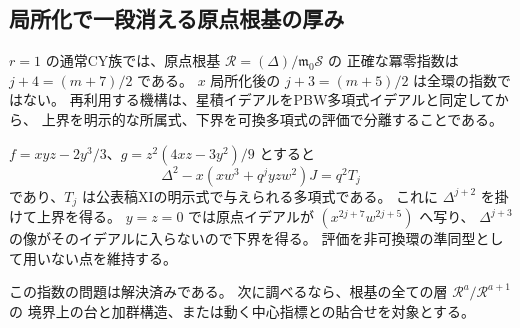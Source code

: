 \subsection{局所化で一段消える原点根基の厚み}

$r=1$ の通常CY族では、原点根基 $\mathcal R=(\Delta)/\mathfrak m_0\mathcal S$ の
正確な冪零指数は $j+4=(m+7)/2$ である。
$x$ 局所化後の $j+3=(m+5)/2$ は全環の指数ではない。
再利用する機構は、星積イデアルをPBW多項式イデアルと同定してから、
上界を明示的な所属式、下界を可換多項式の評価で分離することである。

$f=xyz-2y^3/3$、$g=z^2(4xz-3y^2)/9$ とすると
\[
 \Delta^2-x(xw^3+q^jyz w^2)J=q^2T_j
\]
であり、$T_j$ は公表稿XIの明示式で与えられる多項式である。
これに $\Delta^{j+2}$ を掛けて上界を得る。
$y=z=0$ では原点イデアルが $(x^{2j+7}w^{2j+5})$ へ写り、
$\Delta^{j+3}$ の像がそのイデアルに入らないので下界を得る。
評価を非可換環の準同型として用いない点を維持する。

この指数の問題は解決済みである。
次に調べるなら、根基の全ての層 $\mathcal R^a/\mathcal R^{a+1}$ の
境界上の台と加群構造、または動く中心指標との貼合せを対象とする。
